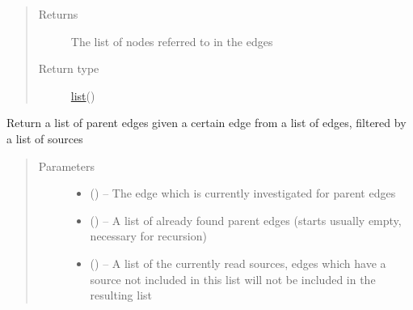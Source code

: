 \documentclass[letterpaper,10pt,english]{sphinxmanual}
\begin{document}
\begin{fulllineitems}
\begin{fulllineitems}
\begin{quote}
\begin{description}
\item[{Returns}] \leavevmode
The list of nodes referred to in the edges

\item[{Return type}] \leavevmode
\href{https://docs.python.org/2/library/functions.html\#list}{list}({\hyperref[\detokenize{node:node.Node}]{}})

\end{description}\end{quote}

\end{fulllineitems}


\begin{fulllineitems}
\label{\detokenize{concept_map:concept_map.ConceptMap.find_prerequisites}}
Return a list of parent edges given a certain edge from a list of edges, filtered by a list of sources
\begin{quote}\begin{description}
\item[{Parameters}] \leavevmode\begin{itemize}
\item {} 
 ({\hyperref[\detokenize{edge:edge.Edge}]{}}) -- The edge which is currently investigated for parent edges

\item {} 
 (\href{https://docs.python.org/2/library/functions.html\#list}{}\sphinxstyleliteralemphasis{)}\sphinxstyleliteralemphasis{}) -- A list of already found parent edges (starts usually empty, necessary for recursion)

\item {} 
 (\href{https://docs.python.org/2/library/functions.html\#list}{}\sphinxstyleliteralemphasis{(}\href{https://docs.python.org/2/library/string.html\#module-string}{}\sphinxstyleliteralemphasis{)}\sphinxstyleliteralemphasis{}) -- A list of the currently read sources, edges which have a source not included in this list  will not be included in the resulting list


\end{itemize}
\end{description}
\end{quote}
\end{fulllineitems}
\end{fulllineitems}
\end{document}
